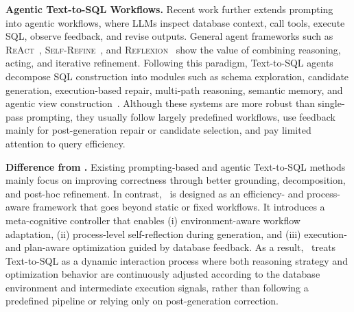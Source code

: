 \textbf{Agentic Text-to-SQL Workflows.}
Recent work further extends prompting into agentic workflows, where LLMs inspect database context, call tools, execute SQL, observe feedback, and revise outputs.
General agent frameworks such as \textsc{ReAct}~\cite{yao2023react}, \textsc{Self-Refine}~\cite{madaan2023selfrefine}, and \textsc{Reflexion}~\cite{shinn2023reflexion} show the value of combining reasoning, acting, and iterative refinement.
Following this paradigm, Text-to-SQL agents decompose SQL construction into modules such as schema exploration, candidate generation, execution-based repair, multi-path reasoning, semantic memory, and agentic view construction~\cite{wang2023mac,pourreza2024chasesql,deng2025reforce,chaturvedi2025sqlthought,heidari2025agentiql,yang2025marssql,pham2026avsql,biswal2026agentsm}.
Although these systems are more robust than single-pass prompting, they usually follow largely predefined workflows, use feedback mainly for post-generation repair or candidate selection, and pay limited attention to query efficiency.

\textbf{Difference from \toolname.}
Existing prompting-based and agentic Text-to-SQL methods mainly focus on improving correctness through better grounding, decomposition, and post-hoc refinement.
In contrast, \toolname\ is designed as an efficiency- and process-aware framework that goes beyond static or fixed workflows.
%
It introduces a meta-cognitive controller that enables (i) environment-aware workflow adaptation, (ii) process-level self-reflection during generation, and (iii) execution- and plan-aware optimization guided by database feedback.
As a result, \toolname\ treats Text-to-SQL as a dynamic interaction process where both reasoning strategy and optimization behavior are continuously adjusted according to the database environment and intermediate execution signals, rather than following a predefined pipeline or relying only on post-generation correction.
